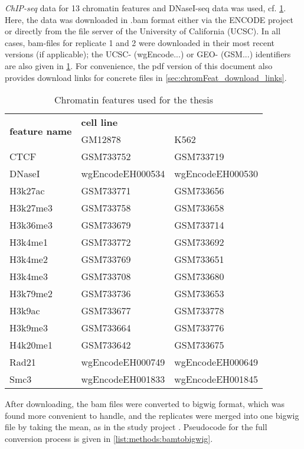\emph{ChIP-seq} data for 13 chromatin features and DNaseI-seq data was used, cf. \cref{tab:methods:csdata}.
Here, the data was downloaded in .bam format either via the ENCODE project \cite{Encode2012,Davis2017} 
or directly from the file server of the University of California (UCSC). 
In all cases, bam-files for replicate 1 and 2 were downloaded in their most recent versions (if applicable);
the UCSC- (wgEncode...) or GEO- (GSM...) identifiers are also given in \cref{tab:methods:csdata}.
For convenience, the pdf version of this document also provides download links for concrete files in \cref{sec:chromFeat_download_links}.
\begin{table}[ht!]
\centering
 \begin{tabular}{lll}
 \hline
  \multicolumn{1}{c}{\multirow{2}{*}{\textbf{feature name}}} & \multicolumn{2}{l}{\hspace*{18mm}\textbf{cell line}} \\
\multicolumn{1}{c}{}                                       & GM12878             & K562             \\ \hline
  CTCF & GSM733752 & GSM733719\\
  DNaseI & wgEncodeEH000534 & wgEncodeEH000530\\
  H3k27ac & GSM733771 & GSM733656\\
  H3k27me3 &GSM733758 & GSM733658\\
  H3k36me3 &GSM733679 & GSM733714\\
  H3k4me1  &GSM733772 & GSM733692\\
  H3k4me2  &GSM733769 & GSM733651\\
  H3k4me3 &GSM733708 & GSM733680\\
  H3k79me2 &GSM733736	& GSM733653	\\
  H3k9ac &GSM733677 & GSM733778\\
  H3k9me3 &GSM733664 & GSM733776	\\
  H4k20me1 &GSM733642 & GSM733675\\
  Rad21 &	wgEncodeEH000749 & wgEncodeEH000649\\
  Smc3 & 	wgEncodeEH001833 & wgEncodeEH001845\\ \hline
 \end{tabular}
 \caption{Chromatin features used for the thesis} \label{tab:methods:csdata}
\end{table}

After downloading, the bam files were converted to bigwig format, which was found more convenient to handle, and the replicates were merged into 
one bigwig file by taking the mean, as in the study project \cite{Krauth2020}. 
Pseudocode for the full conversion process is given in \cref{list:methods:bamtobigwig}.

